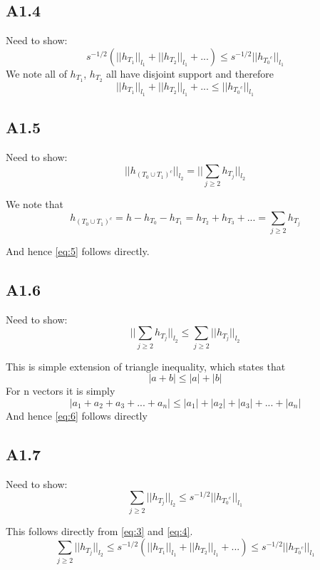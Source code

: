 \documentclass{article}
\newcommand{\lone}[1]{
  ||#1||_{l_1}
}
\newcommand{\ltwo}[1]{
  ||#1||_{l_2}
}
\newcommand{\htj}[1]{
  h_{T_{#1}}
}
\newcommand{\htc}[1]{
  h_{{#1}^c}
}
\newcommand{\hto}[1]{
  h_{#1}
}
\begin{document}
\subsection*{A1.4}
Need to show:
\begin{equation}
  \label{eq:4}
  s^{-1/2}(\lone{\htj{1}} + \lone{\htj{2}} + ...) \le s^{-1/2}\lone{\htc{T_0}}
\end{equation}
We note all of $\htj{1}$, $\htj{2}$ all have disjoint support and therefore
$$\lone{\htj{1}} + \lone{\htj{2}} + ... \le \lone{\htc{T_0}}$$



\subsection*{A1.5}
Need to show:
\begin{equation}
  \label{eq:5}
  \ltwo{\htc{(T_0 \cup T_1)}} = \ltwo{\sum_{j \ge 2}\htj{j}}
\end{equation}

We note that $$\htc{(T_0 \cup T_1)} = h - \hto{T_0} - \hto{T_1} = \hto{T_2} + \hto{T_3} + ... = \sum_{j \ge 2} \hto{T_j}$$

And hence \ref{eq:5} follows directly.

\subsection*{A1.6}
Need to show:
\begin{equation}
  \label{eq:6}
  \ltwo{\sum_{j \ge 2}{\htj{j}}} \le \sum_{j \ge 2} \ltwo{\htj{j}}
\end{equation}

This is simple extension of triangle inequality, which states that
$$|a+b| \le |a| + |b|$$
For n vectors it is simply
$$|a_1 + a_2 + a_3 +... +a_n| \le |a_1| + |a_2| + |a_3| + ... + |a_n| $$
And hence \ref{eq:6} follows directly

\subsection*{A1.7}
Need to show:
\begin{equation}
  \label{eq:7}
  \sum_{j \ge 2} \ltwo{\htj{j}} \le s^{-1/2}\lone{\htc{T_0}}
\end{equation}

This follows directly from \ref{eq:3} and \ref{eq:4}.
$$\sum_{j \ge 2} \ltwo{\htj{j}} \le s^{-1/2}(\lone{\htj{1}} + \lone{\htj{2}} + ...) \le s^{-1/2}\lone{\htc{T_0}}$$
\end{document}
